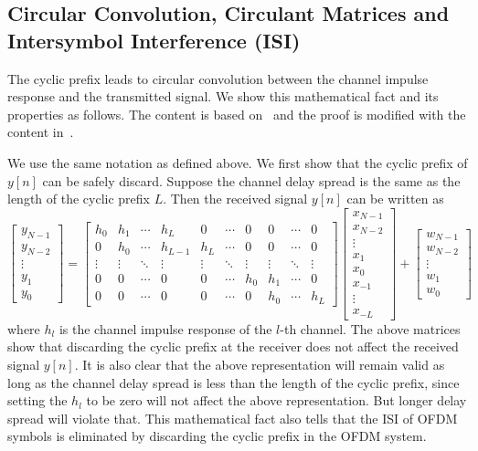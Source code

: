 \subsection{Circular Convolution, Circulant Matrices and Intersymbol Interference (ISI)}
The cyclic prefix leads to circular convolution between the channel impulse response and the transmitted signal. We show this mathematical fact and its properties as follows. The content is based on~\cite{91291216} and the proof is modified with the content in~\cite{2024Apr}.

We use the same notation as defined above. We first show that the cyclic prefix of $y[n]$ can be safely discard. Suppose the channel delay spread is the same as the length of the cyclic prefix $L$. Then the received signal $y[n]$ can be written as
\begin{equation}
    \label{eq:circ_conv}
    \begin{bmatrix}
        y_{N-1} \\ y_{N-2} \\ \vdots \\ y_1 \\ y_0
    \end{bmatrix}
    =
    \begin{bmatrix}
        h_0 & h_1 & \cdots & h_{L} & 0 & \cdots & 0 & 0 & \cdots & 0 \\
        0 & h_0 & \cdots & h_{L-1} & h_{L} & \cdots & 0 & 0 & \cdots & 0 \\
        \vdots & \vdots & \ddots & \vdots & \vdots & \ddots & \vdots & \vdots & \ddots & \vdots \\
        0 & 0 & \cdots & 0 & 0 & \cdots & h_0 & h_1 & \cdots & 0 \\
        0 & 0 & \cdots & 0 & 0 & \cdots & 0 & h_0 & \cdots & h_{L}
    \end{bmatrix}
    \begin{bmatrix}
        x_{N-1} \\ x_{N-2} \\ \vdots \\ x_1 \\ x_0 \\ x_{-1} \\ \vdots \\ x_{-L}
    \end{bmatrix}
    +
    \begin{bmatrix}
        w_{N-1} \\ w_{N-2} \\ \vdots \\ w_1 \\ w_0
    \end{bmatrix}
\end{equation}
where $h_l$ is the channel impulse response of the $l$-th channel. The above matrices show that discarding the cyclic prefix at the receiver does not affect the received signal $y[n]$. It is also clear that the above representation will remain valid as long as the channel delay spread is less than the length of the cyclic prefix, since setting the $h_l$ to be zero will not affect the above representation. But longer delay spread will violate that. This mathematical fact also tells that the ISI of OFDM symbols is eliminated by discarding the cyclic prefix in the OFDM system.

